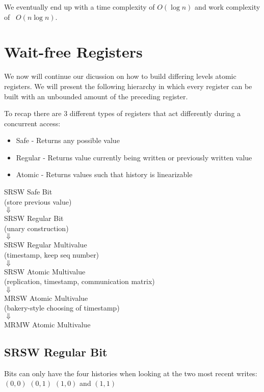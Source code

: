 \documentclass[twoside]{article}
\begin{document}
We eventually end up with a time complexity of $O(\log n)$ and work complexity of ~$O(n \log n)$.

\section{Wait-free Registers}

We now will continue our dicussion on how to build differing levels atomic registers. We will present the following hierarchy in which every register can be built with an unbounded amount of the preceding register.

To recap there are 3 different types of registers that act differently during a concurrent access:
\begin{itemize}
\item Safe - Returns any possible value
\item Regular - Returns value currently being written or previously written value
\item Atomic - Returns values such that history is linearizable
\end{itemize}

\begin{center}
SRSW Safe Bit \\
(store previous value) \\ $\Downarrow$ \\
SRSW Regular Bit \\
(unary construction) \\ $\Downarrow$\\
SRSW Regular Multivalue \\
(timestamp, keep seq number) \\ $\Downarrow$ \\
SRSW Atomic Multivalue \\
(replication, timestamp, communication matrix) \\ $\Downarrow$ \\
MRSW Atomic Multivalue \\
(bakery-style choosing of timestamp) \\ $\Downarrow$ \\
MRMW Atomic Multivalue \\
\end{center}

\subsection{SRSW Regular Bit}

Bits can only have the four histories when looking at the two most recent writes: \\ $(0,0)$ $(0, 1)$ $(1, 0)$ and $(1, 1)$
\end{document}
